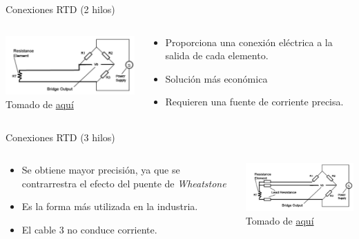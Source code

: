 \documentclass[aspectratio=169]{beamer}
\begin{document}
\begin{frame}{Conexiones RTD (2 hilos)}
    \begin{columns}[c, onlytextwidth]
    \begin{column}{0.50\textwidth}
        \includegraphics[width=7cm]{fig/2hilosRTD.PNG}
            \\ \tiny{Tomado de \href{http://www.bearingsensor.com/bearing-rtd.html}{aquí}}
            
        \end{column}
    \begin{column}{0.55\textwidth}
            \begin{itemize}
                \item Proporciona una conexión eléctrica a la salida de cada elemento.     
                \item Solución más económica
                \item Requieren una fuente de corriente precisa. 
            \end{itemize}
        \end{column}
    \end{columns}
\end{frame}
\begin{frame}{Conexiones RTD (3 hilos)}
    \begin{columns}[c, onlytextwidth]
    \begin{column}{0.55\textwidth}
            \begin{itemize}
                \item Se obtiene mayor precisión, ya que se contrarrestra el efecto del puente de \textit{Wheatstone}     
                \item Es la forma más utilizada en la industria.
                \item El cable 3 no conduce corriente.
            \end{itemize}
        \end{column}
        \begin{column}{0.45\textwidth}
        \includegraphics[width=7cm]{fig/3hilosRTD.PNG}
            \\ \tiny{Tomado de \href{http://www.bearingsensor.com/bearing-rtd.html}{aquí}}
            
        \end{column}
        
    \end{columns}
\end{frame}
\end{document}
